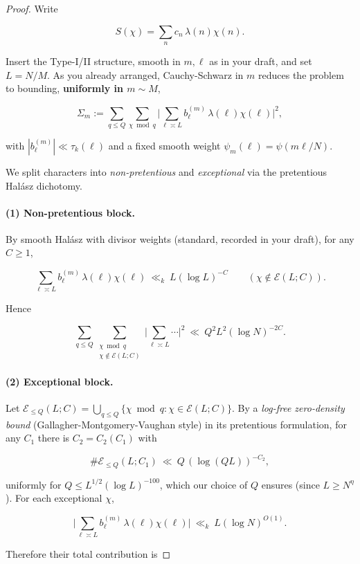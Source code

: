 \documentclass[11pt]{article}
\theoremstyle{definition}
\theoremstyle{remark}
\numberwithin{equation}{part}
\begin{document}
\begin{proof}
	Write

	$$
		S(\chi)=\sum_{n} c_n\,\lambda(n)\chi(n).
	$$

	Insert the Type-I/II structure, smooth in $m,\ell$ as in your draft, and set $L=N/M$. As you already arranged, Cauchy-Schwarz in $m$ reduces the problem to bounding, \textbf{uniformly in $m\sim M$},

	$$
		\Sigma_m:=\sum_{q\le Q}\sum_{\chi\bmod q}\Big|\sum_{\ell\asymp L} b^{(m)}_\ell\,\lambda(\ell)\chi(\ell)\Big|^2,
	$$

	with $|b^{(m)}_\ell|\ll \tau_k(\ell)$ and a fixed smooth weight $\psi_m(\ell)=\psi(m\ell/N)$.

	We split characters into \emph{non-pretentious} and \emph{exceptional} via the pretentious Halász dichotomy.

	\paragraph{(1) Non-pretentious block.}
	By smooth Halász with divisor weights (standard, recorded in your draft), for any $C\ge 1$,

	$$
		\sum_{\ell\asymp L} b^{(m)}_\ell\,\lambda(\ell)\chi(\ell)\ \ll_k\ L(\log L)^{-C}
		\qquad(\chi\notin\mathcal E(L;C)).
	$$

	Hence

	$$
		\sum_{q\le Q}\sum_{\substack{\chi\bmod q\\ \chi\notin\mathcal E(L;C)}}
		\Big|\sum_{\ell\asymp L}\cdots\Big|^2\ \ll\ Q^2 L^2 (\log N)^{-2C}.
	$$

	\paragraph{(2) Exceptional block.}
	Let $\mathcal E_{\le Q}(L;C)=\bigcup_{q\le Q}\{\chi\bmod q:\chi\in\mathcal E(L;C)\}$. By a \emph{log-free zero-density bound} (Gallagher-Montgomery-Vaughan style) in its pretentious formulation, for any $C_1$ there is $C_2=C_2(C_1)$ with

	$$
		\#\mathcal E_{\le Q}(L;C_1)\ \ll\ Q\,(\log (QL))^{-C_2},
	$$

	uniformly for $Q\le L^{1/2}(\log L)^{-100}$, which our choice of $Q$ ensures (since $L\ge N^{\eta}$). For each exceptional $\chi$,

	$$
		\Big|\sum_{\ell\asymp L} b^{(m)}_\ell\,\lambda(\ell)\chi(\ell)\Big|
		\ \ll_k\ L(\log N)^{O(1)}.
	$$

	Therefore their total contribution is


\end{proof}
\end{document}
